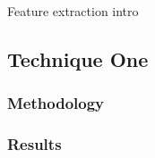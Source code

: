 
Feature extraction intro

\subsection{Technique One}
\label{subsubsec:2.3_featext_tech1}

\subsubsection{Methodology}

\subsubsection{Results}	
